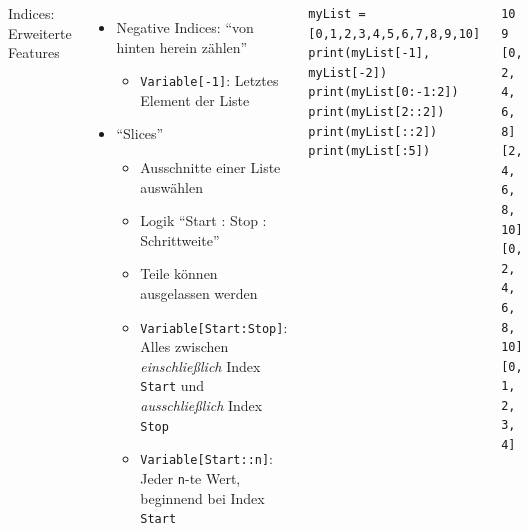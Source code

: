 \begin{frame}[fragile]
%
\begin{columns}[t]
\begin{Large}
{Indices: Erweiterte Features}
\vspace{6pt}
\end{Large}
\begin{itemize}
\item Negative Indices: \enquote{von hinten herein zählen}
	\begin{itemize}
	\item \texttt{Variable[-1]}: Letztes Element der Liste
	\end{itemize}
\item \enquote{Slices}
	\begin{itemize}
	\item Ausschnitte einer Liste auswählen
	\item Logik \enquote{Start : Stop : Schrittweite}
	\item Teile können ausgelassen werden
	\item \texttt{Variable[Start:Stop]}: Alles zwischen \emph{einschließlich} Index \texttt{Start} und \emph{ausschließlich} Index \texttt{Stop}
	\item \texttt{Variable[Start::n]}: Jeder \texttt{n}-te Wert, beginnend bei Index \texttt{Start}
	\end{itemize}
\end{itemize}
%
\begin{codebox}
\begin{verbatim}
myList = [0,1,2,3,4,5,6,7,8,9,10]
print(myList[-1], myList[-2])
print(myList[0:-1:2])
print(myList[2::2])
print(myList[::2])
print(myList[:5])
\end{verbatim}
\end{codebox}
%
\begin{cmdbox}[Ausgabe]
\begin{verbatim}
10 9
[0, 2, 4, 6, 8]
[2, 4, 6, 8, 10]
[0, 2, 4, 6, 8, 10]
[0, 1, 2, 3, 4]
\end{verbatim}
\end{cmdbox}\end{columns}
%
\end{frame}


